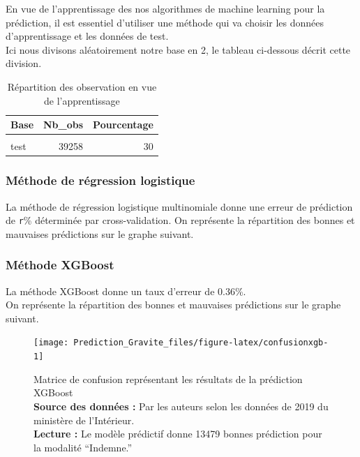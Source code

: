 \documentclass[french,]{tp}
\begin{document}
En vue de l'apprentissage des nos algorithmes de machine learning pour la prédiction, il est essentiel d'utiliser une méthode qui va choisir les données d'apprentissage et les données de test.\\
Ici nous divisons aléatoirement notre base en 2, le tableau ci-dessous décrit cette division.



\begin{table}[H]

\caption{\label{tab:tabletraintest}Répartition des observation en vue de l'apprentissage}
\centering
\begin{tabular}[t]{lrr}
\toprule
\textbf{Base} & \textbf{Nb\_obs} & \textbf{Pourcentage}\\
\midrule
\cellcolor{gray!6}{train} & \cellcolor{gray!6}{91599} & \cellcolor{gray!6}{70}\\
test & 39258 & 30\\
\bottomrule
\end{tabular}
\end{table}

\newpage

\hypertarget{muxe9thode-de-ruxe9gression-logistique}{%
\subsubsection{Méthode de régression logistique}\label{muxe9thode-de-ruxe9gression-logistique}}

La méthode de régression logistique multinomiale donne une erreur de prédiction de \texttt{r}\% déterminée par cross-validation.
On représente la répartition des bonnes et mauvaises prédictions sur le graphe suivant.





\newpage

\hypertarget{muxe9thode-xgboost}{%
\subsubsection{Méthode XGBoost}\label{muxe9thode-xgboost}}

La méthode XGBoost donne un taux d'erreur de 0.36\%.\\
On représente la répartition des bonnes et mauvaises prédictions sur le graphe suivant.

\begin{figure}[ht!]

{\centering \texttt{[image: Prediction\_Gravite\_files/figure-latex/confusionxgb-1]} 

}

\caption{Matrice de confusion représentant les résultats de la prédiction XGBoost\\
\textbf{Source des données :} Par les auteurs selon les données de 2019 du ministère de l'Intérieur.\\
\textbf{Lecture :} Le modèle prédictif donne 13479 bonnes prédiction pour la modalité ``Indemne.''}\label{fig:confusionxgb}
\end{figure}
\end{document}
